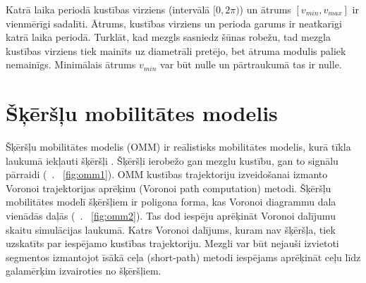 Katrā laika periodā kustības virziens (intervālā $[0, 2\pi)$) un ātrums $[v_{min}, v_{max}]$ ir vienmērīgi sadalīti. Ātrums, kustības virziens un perioda garums ir neatkarīgi katrā laika periodā. Turklāt, kad mezgls sasniedz šūnas robežu, tad mezgla kustības virziens tiek mainīts uz diametrāli pretējo, bet ātruma modulis paliek nemainīgs. Minimālais ātrums $v_{min}$ var būt nulle un pārtraukumā tas ir nulle.


\section{Šķēršļu mobilitātes modelis}
Šķēršļu mobilitātes modelis (\acs{OMM})  ir reālistisks mobilitātes modelis, kurā tīkla laukumā iekļauti šķēršļi \cite{jabra,jabras}. Šķēršļi ierobežo gan mezglu kustību, gan to signālu pārraidi (\seename ~\figurename. ~\ref{fig:omm1}). \acs{OMM} kustības trajektoriju izveidošanai izmanto Voronoi trajektorijas aprēķinu (Voronoi path computation) metodi\cite{aur}. Šķēršļu mobilitātes modelī šķēršļiem ir poligona forma, kas Voronoi diagrammu dala vienādās daļās (\seename ~\figurename. ~\ref{fig:omm2}). Tas dod iespēju aprēķināt Voronoi dalījumu skaitu simulācijas laukumā. Katrs Voronoi dalījums, kuram nav šķēršļa, tiek uzskatīts par iespējamo kustības trajektoriju.
 Mezgli var būt nejauši izvietoti segmentos izmantojot īsākā ceļa (short-path) metodi iespējams aprēķināt ceļu līdz galamērķim izvairoties no šķēršļiem.

